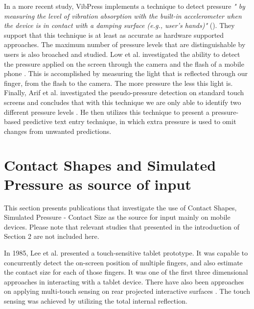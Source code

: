 In a more recent study, VibPress \cite{Hwang:2013:VEP:2493190.2493193} implements a technique to detect pressure \emph{" by measuring the level of vibration absorption with the built-in accelerometer when the device is in contact with a damping surface (e.g., user's hands)"} (\cite{Hwang:2013:VEP:2493190.2493193}). They support that this technique is at least as accurate as hardware supported approaches. The maximum number of pressure levels that are distinguishable by users is also broached and studied.
Low et al. investigated the ability to detect the pressure applied on the screen through the camera and the flash of a mobile phone \cite{Low:2014:PDM:2582051.2582062}. This is accomplished by measuring the light that is reflected through our finger, from the flash to the camera. The more pressure the less this light is.
Finally, Arif et al. investigated the pseudo-pressure detection on standard touch screens and concludes that with this technique we are only able to identify two different pressure levels \cite{Arif:2013:PDU:2541016.2541024}. He then utilizes this technique to present a pressure-based predictive text entry technique, in which extra pressure is used to omit changes from unwanted predictions.



\section{Contact Shapes and Simulated Pressure as source of input}
\label{sec:simulatedPressure}

This section presents publications that investigate the use of Contact Shapes, Simulated Pressure - Contact Size as the source for input mainly on mobile devices. Please note that relevant studies that presented in the introduction of Section 2 are not included here.

In 1985, Lee et al. \cite{Lee:1985:MTD:1165385.317461} presented a touch-sensitive tablet prototype. It was capable to concurrently detect the on-screen position of multiple fingers, and also estimate the contact size for each of those fingers. It was one of the first three dimensional approaches in interacting with a tablet device.  There have also been approaches on applying multi-touch sensing on rear projected interactive surfaces \cite{Han:2005:LMS:1095034.1095054}. The touch sensing was achieved by utilizing the total internal reflection.

